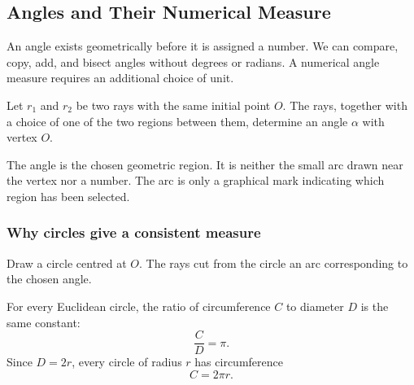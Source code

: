 \subsection{Angles and Their Numerical Measure}

\begin{corebox}
An angle exists geometrically before it is assigned a number. We can compare,
copy, add, and bisect angles without degrees or radians. A numerical angle
measure requires an additional choice of unit.
\end{corebox}

\begin{definitionbox}
Let $r_1$ and $r_2$ be two rays with the same initial point $O$. The rays,
together with a choice of one of the two regions between them, determine an
angle $\alpha$ with vertex $O$.
\end{definitionbox}

\begin{remarkbox}
The angle is the chosen geometric region. It is neither the small arc drawn near
the vertex nor a number. The arc is only a graphical mark indicating which
region has been selected.
\end{remarkbox}

\begin{center}
\end{center}

\subsubsection*{Why circles give a consistent measure}

Draw a circle centred at $O$. The rays cut from the circle an arc corresponding
to the chosen angle.

\begin{theorembox}
For every Euclidean circle, the ratio of circumference $C$ to diameter $D$ is
the same constant:
\[
\frac{C}{D}=\pi.
\]
Since $D=2r$, every circle of radius $r$ has circumference
\[
\boxed{C=2\pi r}.
\]
\end{theorembox}

